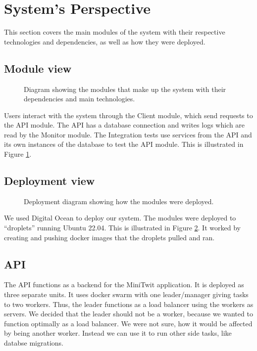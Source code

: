 \section{System's Perspective}
\label{ch:sys_persp} %

This section covers the main modules of the system with their  
respective technologies and dependencies, as well as how they
were deployed.

\subsection{Module view}

\begin{figure}[H]
    \centering
    
    \caption{Diagram showing the modules that make up the system with
    their dependencies and main technologies.}
    \label{fig:modules}
\end{figure}

Users interact with the system through the Client module,
which send requests to the API module. The API has a database 
connection and writes logs which are read by the Monitor module.
The Integration tests use services from the API and its own instances
of the database to test the API module.
This is illustrated in Figure \ref{fig:modules}.

\subsection{Deployment view}

\begin{figure}[H]
      \centering
      \makebox[\linewidth]{
      }
      \caption{Deployment diagram showing how the modules were deployed.}
      \label{fig:deployment_diagram}
\end{figure}

We used Digital Ocean to deploy our system.
The modules were deployed to ``droplets'' running Ubuntu 22.04.
This is illustrated in Figure \ref{fig:deployment_diagram}.
It worked by creating and pushing docker images that the 
droplets pulled and ran.

\subsection{API}

The API functions as a backend for the MiniTwit application.
It is deployed as three separate units. 
It uses docker swarm with one leader/manager 
giving tasks to two workers. Thus, the leader functions as a 
load balancer using the workers as servers.
We decided that the leader should not be a worker,
because we wanted to function optimally as a load balancer.
We were not sure, how it would be affected by being another worker.
Instead we can use it to run other side tasks, like databse migrations.

